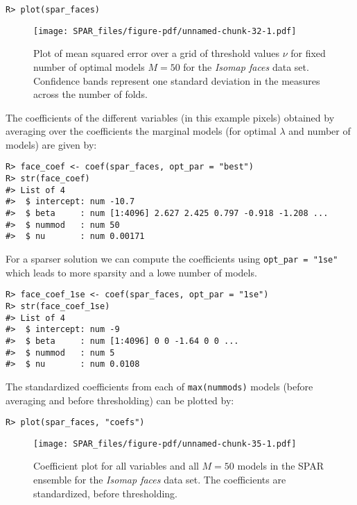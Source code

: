 \documentclass[
  article]{jss}
\begin{document}
\begin{verbatim}
R> plot(spar_faces)
\end{verbatim}

\begin{figure}[H]

{\centering \texttt{[image: SPAR\_files/figure-pdf/unnamed-chunk-32-1.pdf]}

}

\caption{Plot of mean squared error over a grid of threshold values
\(\nu\) for fixed number of optimal models \(M=50\) for the
\emph{Isomap faces} data set. Confidence bands represent one standard
deviation in the measures across the number of folds.
\label{fig:facesplot_valmeasure}}

\end{figure}%

The coefficients of the different variables (in this example pixels)
obtained by averaging over the coefficients the marginal models (for
optimal \(\lambda\) and number of models) are given by:

\begin{verbatim}
R> face_coef <- coef(spar_faces, opt_par = "best")
R> str(face_coef)
#> List of 4
#>  $ intercept: num -10.7
#>  $ beta     : num [1:4096] 2.627 2.425 0.797 -0.918 -1.208 ...
#>  $ nummod   : num 50
#>  $ nu       : num 0.00171
\end{verbatim}

For a sparser solution we can compute the coefficients using
\texttt{opt\_par\ =\ "1se"} which leads to more sparsity and a lowe
number of models.

\begin{verbatim}
R> face_coef_1se <- coef(spar_faces, opt_par = "1se")
R> str(face_coef_1se)
#> List of 4
#>  $ intercept: num -9
#>  $ beta     : num [1:4096] 0 0 -1.64 0 0 ...
#>  $ nummod   : num 5
#>  $ nu       : num 0.0108
\end{verbatim}

The standardized coefficients from each of \texttt{max(nummods)} models
(before averaging and before thresholding) can be plotted by:

\begin{verbatim}
R> plot(spar_faces, "coefs")
\end{verbatim}

\begin{figure}[H]

{\centering \texttt{[image: SPAR\_files/figure-pdf/unnamed-chunk-35-1.pdf]}

}

\caption{Coefficient plot for all variables and all \(M=50\) models in
the SPAR ensemble for the \emph{Isomap faces} data set. The coefficients
are standardized, before thresholding. \label{fig:faces_coefs}}

\end{figure}%
\end{document}

